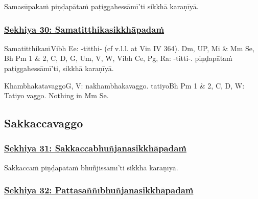 Samasūpakaṁ piṇḍapātaṁ paṭiggahessāmī'ti sikkhā karaṇīyā.



\subsubsection*{\hyperref[training30]{Sekhiya 30: Samatitthikasikkhāpadaṁ}}
\label{sekh30}

Samatitthikaṁ\makeatletter\hyperlink{endnote-appendix}\makeatother Vibh Ee: -titthi- (cf v.l.l. at Vin IV 364). Dm, UP, Mi & Mm Se, Bh Pm 1 & 2, C, D, G, Um, V, W, Vibh Ce, Pg, Ra: -titti-. piṇḍapātaṁ paṭiggahessāmī'ti, sikkhā karaṇīyā.

\begin{center}
	Khambhakatavaggo\makeatletter\hyperlink{endnote-appendix}\makeatother G, V: nakhambhakavaggo. tatiyo\makeatletter\hyperlink{endnote-appendix}\makeatother Bh Pm 1 & 2, C, D, W: Tatiyo vaggo. Nothing in Mm Se.
\end{center}



\subsection{Sakkaccavaggo}

\subsubsection*{\hyperref[training31]{Sekhiya 31: Sakkaccabhuñjanasikkhāpadaṁ}}
\label{sekh31}

Sakkaccaṁ piṇḍapātaṁ bhuñjissāmī'ti sikkhā karaṇīyā.



\subsubsection*{\hyperref[training32]{Sekhiya 32: Pattasaññībhuñjanasikkhāpadaṁ}}
\label{sekh32}


